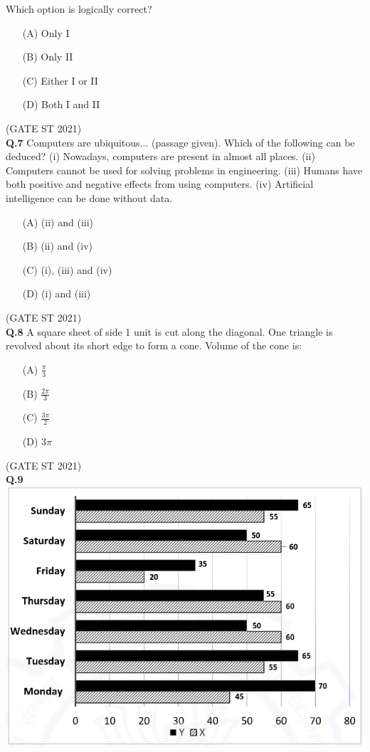\documentclass[journal,12pt,onecolumn]{IEEEtran}
\theoremstyle{remark}
\begin{document}
Which option is logically correct?
\begin{enumerate}
\item[(A)] Only I  
\item[(B)] Only II  
\item[(C)] Either I or II  
\item[(D)] Both I and II
\end{enumerate}

\hfill (GATE ST 2021)\\
\textbf{Q.7}
Computers are ubiquitous... (passage given).  
Which of the following can be deduced?  
(i) Nowadays, computers are present in almost all places.  
(ii) Computers cannot be used for solving problems in engineering.  
(iii) Humans have both positive and negative effects from using computers.  
(iv) Artificial intelligence can be done without data.

\begin{enumerate}
\item[(A)] (ii) and (iii)
\item[(B)] (ii) and (iv)
\item[(C)] (i), (iii) and (iv)
\item[(D)] (i) and (iii)
\end{enumerate}

\hfill (GATE ST 2021)\\

\textbf{Q.8}
A square sheet of side 1 unit is cut along the diagonal.  
One triangle is revolved about its short edge to form a cone.  
Volume of the cone is:

\begin{enumerate}
\item[(A)] $\frac{\pi}{3}$
\item[(B)] $\frac{2\pi}{3}$
\item[(C)] $\frac{3\pi}{2}$
\item[(D)] $3\pi$
\end{enumerate}
\hfill (GATE ST 2021)\\




\textbf{Q.9} \\
   \includegraphics[width=1\linewidth]{figs/4.png} 
  
\end{document}
